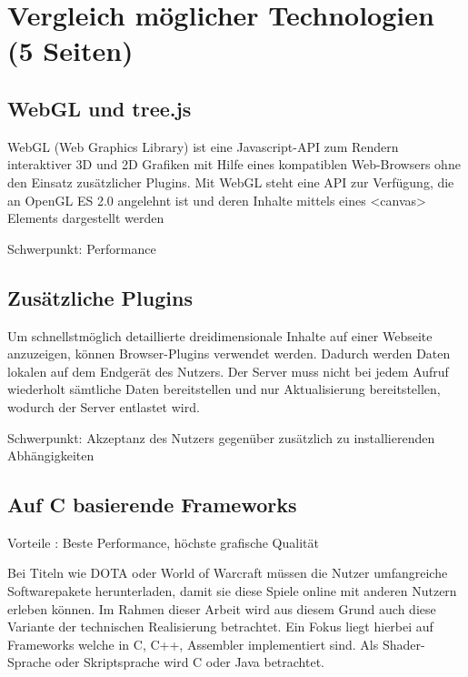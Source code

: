 
\chapter{Vergleich möglicher Technologien (5 Seiten)}


\section{WebGL und tree.js}

WebGL (Web Graphics Library) ist eine Javascript-API zum Rendern interaktiver 3D und 2D Grafiken mit Hilfe eines kompatiblen Web-Browsers ohne den Einsatz zusätzlicher Plugins. Mit WebGL steht eine API zur Verfügung, die an OpenGL ES 2.0 angelehnt ist und deren Inhalte mittels eines <canvas> Elements dargestellt werden

Schwerpunkt: Performance


\section{Zusätzliche Plugins}

Um schnellstmöglich detaillierte dreidimensionale Inhalte auf einer Webseite anzuzeigen, können Browser-Plugins verwendet werden. Dadurch werden Daten lokalen auf dem Endgerät des Nutzers. Der Server muss nicht bei jedem Aufruf wiederholt sämtliche Daten bereitstellen und nur Aktualisierung bereitstellen, wodurch der Server entlastet wird.

Schwerpunkt: Akzeptanz des Nutzers gegenüber zusätzlich zu installierenden Abhängigkeiten


\section{Auf C basierende Frameworks}

Vorteile : Beste Performance, höchste grafische Qualität

Bei Titeln wie DOTA oder World of Warcraft müssen die Nutzer umfangreiche Softwarepakete herunterladen, damit sie diese Spiele online mit anderen Nutzern erleben können. Im Rahmen dieser Arbeit wird aus diesem Grund auch diese Variante der technischen Realisierung betrachtet. Ein Fokus liegt hierbei auf Frameworks welche in C, C++, Assembler implementiert sind. Als Shader-Sprache oder Skriptsprache wird C oder Java betrachtet.

